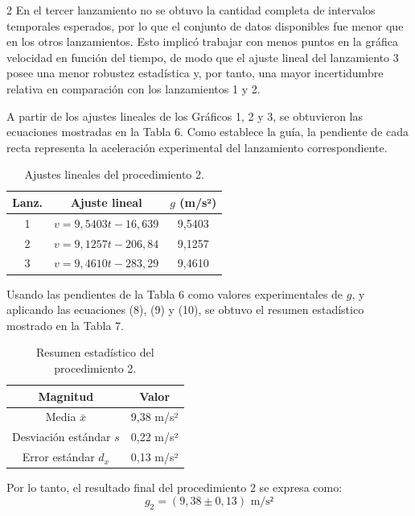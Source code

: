 \documentclass[11pt,letterpaper]{article}
\begin{document}
\begin{multicols}{2}
En el tercer lanzamiento no se obtuvo la cantidad completa de intervalos temporales esperados, por lo que el conjunto de datos disponibles fue menor que en los otros lanzamientos. Esto implicó trabajar con menos puntos en la gráfica velocidad en función del tiempo, de modo que el ajuste lineal del lanzamiento 3 posee una menor robustez estadística y, por tanto, una mayor incertidumbre relativa en comparación con los lanzamientos 1 y 2.

A partir de los ajustes lineales de los Gráficos 1, 2 y 3, se obtuvieron las ecuaciones mostradas en la Tabla 6. Como establece la guía, la pendiente de cada recta representa la aceleración experimental del lanzamiento correspondiente.

\begin{table}[H]
\centering
\footnotesize
\begin{tabular}{ccc}
\toprule
Lanz. & Ajuste lineal & $g$ (m/s²) \\
\midrule
1 & $v = 9,5403 t - 16,639$ & 9,5403 \\
2 & $v = 9,1257 t - 206,84$ & 9,1257 \\
3 & $v = 9,4610 t - 283,29$ & 9,4610 \\
\bottomrule
\end{tabular}
\caption{Ajustes lineales del procedimiento 2.}
\end{table}

Usando las pendientes de la Tabla 6 como valores experimentales de $g$, y aplicando las ecuaciones (8), (9) y (10), se obtuvo el resumen estadístico mostrado en la Tabla 7.

\begin{table}[H]
\centering
\small
\begin{tabular}{cc}
\toprule
Magnitud & Valor \\
\midrule
Media $\bar{x}$ & 9,38 m/s² \\
Desviación estándar $s$ & 0,22 m/s² \\
Error estándar $d_x$ & 0,13 m/s² \\
\bottomrule
\end{tabular}
\caption{Resumen estadístico del procedimiento 2.}
\end{table}

Por lo tanto, el resultado final del procedimiento 2 se expresa como:
\begin{equation}
g_2 = (9,38 \pm 0,13) \text{ m/s²}
\end{equation}


\end{multicols}
\end{document}

